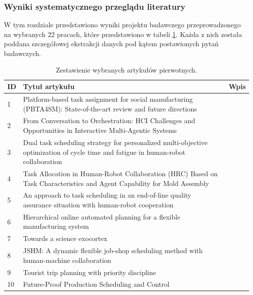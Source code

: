     \subsubsection{Wyniki systematycznego przeglądu literatury}
    
\quad W tym rozdziale przedstawiono wyniki projektu badawczego przeprowadzonego na wybranych 22 pracach, które przedstawiono w tabeli \ref{tab:final_studies}. Każda z nich została poddana szczegółowej ekstrakcji danych pod kątem postawionych pytań badawczych.

\begin{table}[htbp!]
\caption{Zestawienie wybranych artykułów pierwotnych.}
\label{tab:final_studies}
\begin{tabular}{p{0.3cm}p{11.5cm}p{3cm}}
\hline
\textbf{ID} & \textbf{Tytuł artykułu} & \textbf{Wpis} \\ \hline
1 & Platform-based task assignment for social manufacturing (PBTA4SM): State-of-the-art review and future directions & \cite{PBTA4SM} \\ \hline
2 & From Conversation to Orchestration: HCI Challenges and Opportunities in Interactive Multi-Agentic Systems & \cite{orchestration2026} \\ \hline
3 & Dual task scheduling strategy for personalized multi-objective optimization of cycle time and fatigue in human-robot collaboration & \cite{dualTask2023} \\ \hline
4 & Task Allocation in Human-Robot Collaboration (HRC) Based on Task Characteristics and Agent Capability for Mold Assembly & \cite{HRC2020} \\ \hline
5 & An approach to task scheduling in an end-of-line quality assurance situation with human-robot cooperation & \cite{endline2025} \\ \hline
6 & Hierarchical online automated planning for a flexible manufacturing system & \cite{hierarchy2024} \\ \hline
7 & Towards a science exocortex & \cite{exocortex2024} \\ \hline
8 & JSHM: A dynamic flexible job-shop scheduling method with human-machine collaboration & \cite{JSHM2026} \\ \hline
9 & Tourist trip planning with priority discipline & \cite{tourist2025} \\ \hline
10 & Future-Proof Production Scheduling and Control & \cite{future2025} \\ \hline

\end{tabular}
\end{table}
